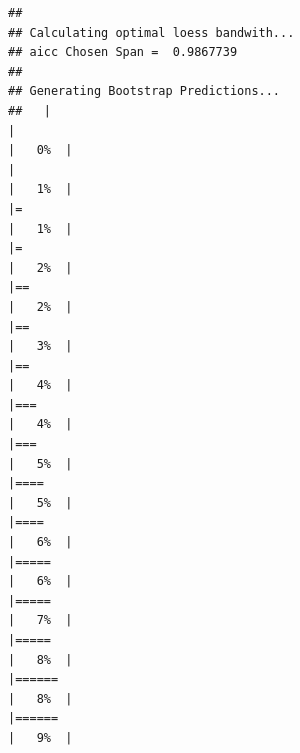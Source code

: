 \documentclass[
  ignorenonframetext,
]{beamer}
\newenvironment{Shaded}{\begin{snugshade}}{\end{snugshade}}
\newcommand{\FunctionTok}[1]{\textcolor[rgb]{0.00,0.00,0.00}{#1}}
\newcommand{\NormalTok}[1]{#1}
\newcommand{\OtherTok}[1]{\textcolor[rgb]{0.56,0.35,0.01}{#1}}
\newcommand{\SpecialCharTok}[1]{\textcolor[rgb]{0.00,0.00,0.00}{#1}}
\begin{document}
\begin{frame}[fragile]{}
\protect\hypertarget{section-15}{}
\tiny

\begin{Shaded}
\end{Shaded}

\begin{verbatim}
## 
## Calculating optimal loess bandwith...
## aicc Chosen Span =  0.9867739 
##  
## Generating Bootstrap Predictions... 
##   |                                                                              |                                                                      |   0%  |                                                                              |                                                                      |   1%  |                                                                              |=                                                                     |   1%  |                                                                              |=                                                                     |   2%  |                                                                              |==                                                                    |   2%  |                                                                              |==                                                                    |   3%  |                                                                              |==                                                                    |   4%  |                                                                              |===                                                                   |   4%  |                                                                              |===                                                                   |   5%  |                                                                              |====                                                                  |   5%  |                                                                              |====                                                                  |   6%  |                                                                              |=====                                                                 |   6%  |                                                                              |=====                                                                 |   7%  |                                                                              |=====                                                                 |   8%  |                                                                              |======                                                                |   8%  |                                                                              |======                                                                |   9%  |    
\end{verbatim}
\end{frame}
\end{document}
